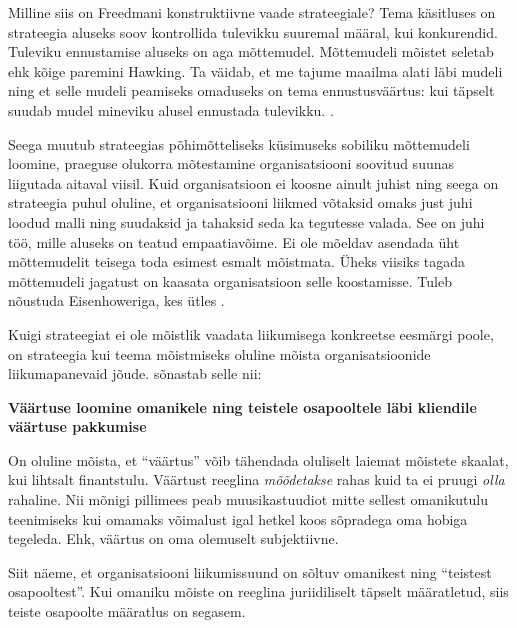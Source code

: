 \documentclass{tufte-book}
\begin{document}
Milline siis on Freedmani konstruktiivne vaade strateegiale? Tema käsitluses on strateegia aluseks soov kontrollida tulevikku suuremal määral, kui konkurendid. Tuleviku ennustamise aluseks on aga mõttemudel. Mõttemudeli mõistet seletab ehk kõige paremini Hawking\cite{mlodinow2010grand}. Ta väidab, et me tajume maailma alati läbi mudeli ning et selle mudeli peamiseks omaduseks on tema ennustusväärtus: kui täpselt suudab mudel mineviku alusel ennustada tulevikku. . 

Seega muutub strateegias põhimõtteliseks küsimuseks sobiliku mõttemudeli loomine, praeguse olukorra mõtestamine organisatsiooni soovitud suunas liigutada aitaval viisil. Kuid organisatsioon ei koosne ainult juhist ning seega on strateegia puhul oluline, et organisatsiooni liikmed võtaksid omaks just juhi loodud malli ning suudaksid ja tahaksid seda ka tegutesse valada. See on juhi töö, mille aluseks on teatud empaatiavõime. Ei ole mõeldav asendada üht mõttemudelit teisega toda esimest esmalt mõistmata. Üheks viisiks tagada mõttemudeli jagatust on kaasata organisatsioon selle koostamisse. Tuleb nõustuda Eisenhoweriga, kes ütles . 

Kuigi strateegiat ei ole mõistlik vaadata liikumisega konkreetse eesmärgi poole, on strateegia kui teema mõistmiseks oluline mõista organisatsioonide liikumapanevaid jõude. \citeauthor{de2006strategy} sõnastab selle nii:

\begin{center}
	\textbf{Väärtuse loomine omanikele ning teistele osapooltele läbi kliendile väärtuse pakkumise}
\end{center}

On oluline mõista, et \enquote{väärtus} võib tähendada oluliselt laiemat mõistete skaalat, kui lihtsalt finantstulu. Väärtust reeglina \emph{mõõdetakse} rahas kuid ta ei pruugi \emph{olla} rahaline. Nii mõnigi pillimees peab muusikastuudiot mitte sellest omanikutulu teenimiseks kui omamaks võimalust igal hetkel koos sõpradega oma hobiga tegeleda. Ehk, väärtus on oma olemuselt subjektiivne. 

Siit näeme, et organisatsiooni liikumissuund on sõltuv omanikest ning \enquote{teistest osapooltest}. Kui omaniku mõiste on reeglina juriidiliselt täpselt määratletud, siis teiste osapoolte määratlus on segasem. 
\end{document}
